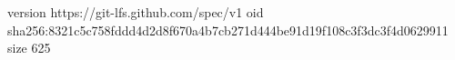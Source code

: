 version https://git-lfs.github.com/spec/v1
oid sha256:8321c5c758fddd4d2d8f670a4b7cb271d444be91d19f108c3f3dc3f4d0629911
size 625
